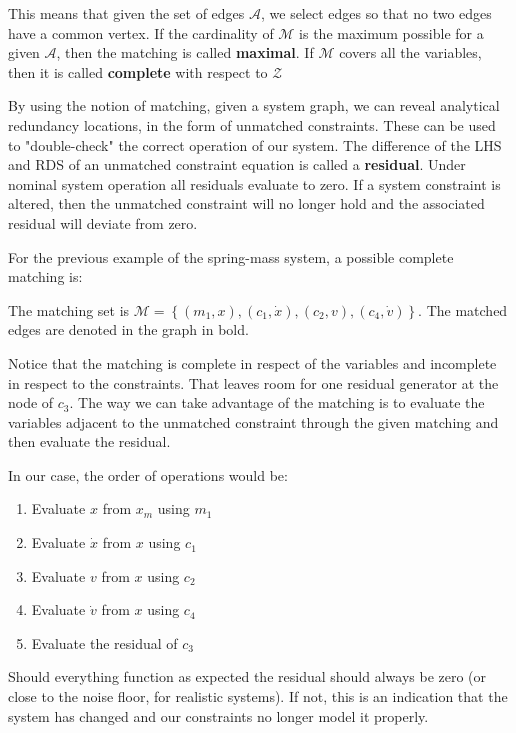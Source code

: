 This means that given the set of edges $\mathcal{A}$, we select edges so that no two edges have a common vertex. If the cardinality of $\mathcal{M}$ is the maximum possible for a given  $\mathcal{A}$, then the matching is called \textbf{maximal}. If  $\mathcal{M}$ covers all the variables, then it is called \textbf{complete} with respect to  $\mathcal{Z}$

By using the notion of matching, given a system graph, we can reveal analytical redundancy locations, in the form of unmatched constraints. These can be used to "double-check" the correct operation of our system. The difference of the LHS and RDS of an unmatched constraint equation is called a \textbf{residual}. Under nominal system operation all residuals evaluate to zero. If a system constraint is altered, then the unmatched constraint will no longer hold and the associated residual will deviate from zero.

For the previous example of the spring-mass system, a possible complete matching is:


The matching set is $\mathcal{M}=\left\{(m_1,x),(c_1,\dot{x}),(c_2,v),(c_4,\dot{v})\right\}$. The matched edges are denoted in the graph in bold.

Notice that the matching is complete in respect of the variables and incomplete in respect to the constraints. That leaves room for one residual generator at the node of $c_3$.
The way we can take advantage of the matching is to evaluate the variables adjacent to the unmatched constraint through the given matching and then evaluate the residual.

In our case, the order of operations would be:
\begin{enumerate}
\itemsep-20pt
\item Evaluate $x$ from $x_m$ using $m_1$\\
\item Evaluate $\dot{x}$ from $x$ using $c_1$\\
\item Evaluate $v$ from $x$ using $c_2$\\
\item Evaluate $\dot{v}$ from $x$ using $c_4$\\
\item Evaluate the residual of $c_3$\\
\end{enumerate}

Should everything function as expected the residual should always be zero (or close to the noise floor, for realistic systems). If not, this is an indication that the system has changed and our constraints no longer model it properly.

